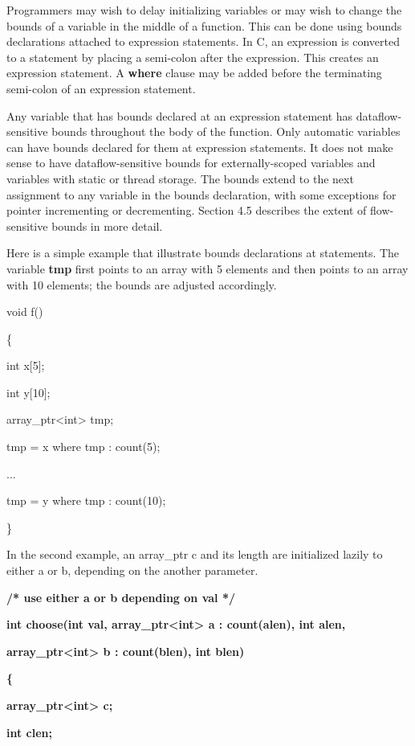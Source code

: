 \documentclass[]{article}
\begin{document}
Programmers may wish to delay initializing variables or may wish to
change the bounds of a variable in the middle of a function. This can be
done using bounds declarations attached to expression statements. In C,
an expression is converted to a statement by placing a semi-colon after
the expression. This creates an expression statement. A \textbf{where}
clause may be added before the terminating semi-colon of an expression
statement.

Any variable that has bounds declared at an expression statement has
dataflow-sensitive bounds throughout the body of the function. Only
automatic variables can have bounds declared for them at expression
statements. It does not make sense to have dataflow-sensitive bounds for
externally-scoped variables and variables with static or thread storage.
The bounds extend to the next assignment to any variable in the bounds
declaration, with some exceptions for pointer incrementing or
decrementing. Section 4.5 describes the extent of flow-sensitive bounds
in more detail.

Here is a simple example that illustrate bounds declarations at
statements. The variable \textbf{tmp} first points to an array with 5
elements and then points to an array with 10 elements; the bounds are
adjusted accordingly.

void f()

\{

int x{[}5{]};

int y{[}10{]};

array\_ptr\textless{}int\textgreater{} tmp;

tmp = x where tmp : count(5);

...

tmp = y where tmp : count(10);

\}

In the second example, an array\_ptr c and its length are initialized
lazily to either a or b, depending on the another parameter.

\textbf{/* use either a or b depending on val */}

\textbf{int choose(int val, array\_ptr\textless{}int\textgreater{} a :
count(alen), int alen,}

\textbf{array\_ptr\textless{}int\textgreater{} b : count(blen), int
blen) }

\textbf{\{}

\textbf{array\_ptr\textless{}int\textgreater{} c;}

\textbf{int clen;}
\end{document}
